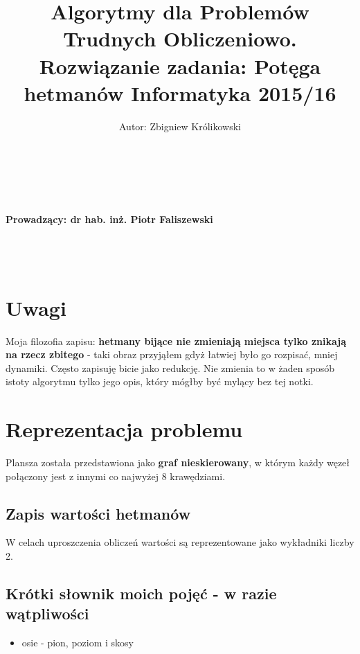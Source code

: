 \documentclass{article}
\author{Autor: Zbigniew Królikowski
\\\\\\\\}
\title{ Algorytmy dla Problemów Trudnych Obliczeniowo.\\
Rozwiązanie zadania: \textbf{Potęga hetmanów}
Informatyka 2015/16}
\begin{document}
\maketitle


\vfill

\paragraph{Prowadzący: dr hab. inż. Piotr Faliszewski
\\\\\\\\
}

\newpage

\section{Uwagi}

Moja filozofia zapisu: \textbf{hetmany bijące nie zmieniają miejsca tylko znikają na rzecz zbitego} - taki obraz przyjąłem gdyż łatwiej było go rozpisać, mniej dynamiki. Często zapisuję bicie jako redukcję. Nie zmienia to w żaden sposób istoty algorytmu tylko jego opis, który mógłby być mylący bez tej notki.

\section{Reprezentacja problemu}

Plansza została przedstawiona jako \textbf{graf nieskierowany}, w którym każdy węzeł połączony jest z innymi co najwyżej 8 krawędziami.

\subsection{Zapis wartości hetmanów}

W celach uproszczenia obliczeń wartości są reprezentowane jako wykładniki liczby 2.

\subsection{Krótki słownik moich pojęć - w razie wątpliwości}

\begin{itemize}
\item osie - pion, poziom i skosy
\end{itemize}

\clearpage
\end{document}
